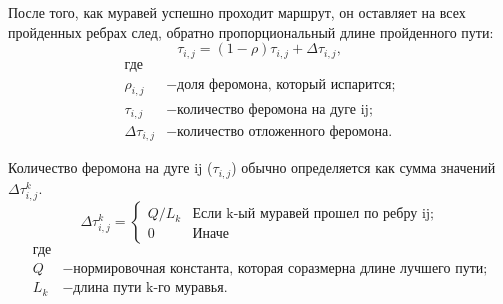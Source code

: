 \documentclass[a4paper, 14pt]{article}
\begin{document}
После того, как муравей успешно проходит маршрут, он оставляет на всех пройденных ребрах след, обратно пропорциональный длине пройденного пути:
\begin{equation}\label{form:eva} 
    \tau _{i,j}=(1-\rho )\tau _{i,j}+\Delta \tau _{i,j},
\end{equation}
\begin{align*}
    \text{где} \\
    \rho _{i,j} &- \text{доля феромона, который испарится;} \\
    \tau _{i,j} &- \text{количество феромона на дуге ij;} \\
    \Delta \tau _{i,j} &- \text{количество отложенного феромона.}
\end{align*}

Количество феромона на дуге ij ($ \tau _{i,j}$) обычно определяется как сумма значений $\Delta \tau _{i,j}^k$.
\begin{equation}\label{form:add} 
    {\displaystyle \Delta \tau _{i,j}^k={\begin{cases}Q/L_{k}& {\mbox{Если k-ый муравей прошел по ребру ij;}}\\0&{\mbox{Иначе}}\end{cases}}}
\end{equation}
\begin{align*}
    \text{где} \\
    Q &- \text{нормировочная константа, которая соразмерна длине лучшего пути;} \\
    L_{k} &- \text{длина пути k-го муравья.}
\end{align*}
\end{document}
